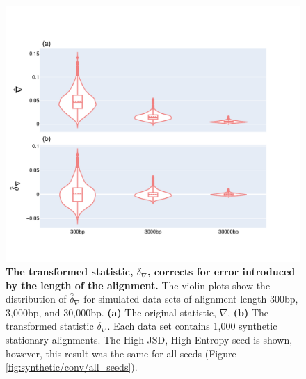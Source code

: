 \begin{figure}[htbp]
\centering
\includegraphics[width=\textwidth]{figures/plots/synthetic/d-conv-vs-conv/High JSD, High Entropy.pdf}
\caption[The transformed statistic, $\delta_\nabla$, corrects for error introduced by the length of the alignment]{\textbf{The transformed statistic, $\delta_\nabla$, corrects for error introduced by the length of the alignment.} The violin plots show the distribution of $\hat \delta_\nabla$ for simulated data sets of alignment length 300bp, 3,000bp, and 30,000bp. \textbf{(a)} The original statistic, $\nabla$, \textbf{(b)} The transformed statistic $\delta_\nabla$. Each data set contains 1,000 synthetic stationary alignments. The High JSD, High Entropy seed is shown, however, this result was the same for all seeds (Figure \ref{fig:synthetic/conv/all_seeds}).}
\label{fig:synthetic/d-conv-vs-conv/HighJSDHighEntropy}
\end{figure}